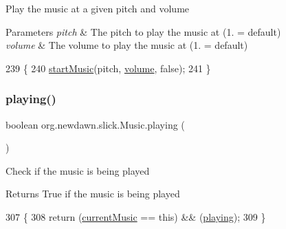 Play the music at a given pitch and volume


\begin{DoxyParams}{Parameters}
{\em pitch} & The pitch to play the music at (1. = default) \\
\hline
{\em volume} & The volume to play the music at (1. = default) \\
\hline
\end{DoxyParams}

\begin{DoxyCode}
239                                                 \{
240         \mbox{\hyperlink{classorg_1_1newdawn_1_1slick_1_1_music_afe4ced4d5134a3bfea291254e6fd2934}{startMusic}}(pitch, \mbox{\hyperlink{classorg_1_1newdawn_1_1slick_1_1_music_a2fa10b80767b1a05925e1dc89a088e90}{volume}}, \textcolor{keyword}{false});
241     \}
\end{DoxyCode}
\mbox{\label{classorg_1_1newdawn_1_1slick_1_1_music_a20709d497ca9027d874f7ffe970ce738}} 
\subsubsection{\texorpdfstring{playing()}{playing()}}
{\footnotesize\ttfamily boolean org.\+newdawn.\+slick.\+Music.\+playing (\begin{DoxyParamCaption}{ }\end{DoxyParamCaption})\hspace{0.3cm}{\ttfamily [inline]}}

Check if the music is being played

\begin{DoxyReturn}{Returns}
True if the music is being played 
\end{DoxyReturn}

\begin{DoxyCode}
307                              \{
308         \textcolor{keywordflow}{return} (\mbox{\hyperlink{classorg_1_1newdawn_1_1slick_1_1_music_a74d1b5592170c007631f4d3b7789dbbf}{currentMusic}} == \textcolor{keyword}{this}) && (\mbox{\hyperlink{classorg_1_1newdawn_1_1slick_1_1_music_a20709d497ca9027d874f7ffe970ce738}{playing}});
309     \}
\end{DoxyCode}
\mbox{\label{classorg_1_1newdawn_1_1slick_1_1_music_af4cdd167509843b9afe9afecbc591217}} 
